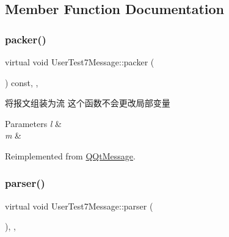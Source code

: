 \subsection{Member Function Documentation}
\mbox{\label{class_user_test7_message_a4b9df59225f5bec202848849c836fd80}} 
\subsubsection{\texorpdfstring{packer()}{packer()}}
{\footnotesize\ttfamily virtual void User\+Test7\+Message\+::packer (\begin{DoxyParamCaption}\item[{Q\+Byte\+Array \&}]{ }\end{DoxyParamCaption}) const\hspace{0.3cm}{\ttfamily [inline]}, {\ttfamily [override]}, {\ttfamily [virtual]}}



将报文组装为流 这个函数不会更改局部变量 


\begin{DoxyParams}{Parameters}
{\em l} & \\
\hline
{\em m} & \\
\hline
\end{DoxyParams}


Reimplemented from \mbox{\hyperlink{class_q_qt_message_af1885c2c3628495808dca66ee8d72e14}{Q\+Qt\+Message}}.

\mbox{\label{class_user_test7_message_ae70deda008c21d6edd2a5b4bcc29590f}} 
\subsubsection{\texorpdfstring{parser()}{parser()}}
{\footnotesize\ttfamily virtual void User\+Test7\+Message\+::parser (\begin{DoxyParamCaption}\item[{const Q\+Byte\+Array \&}]{ }\end{DoxyParamCaption})\hspace{0.3cm}{\ttfamily [inline]}, {\ttfamily [override]}, {\ttfamily [virtual]}}



